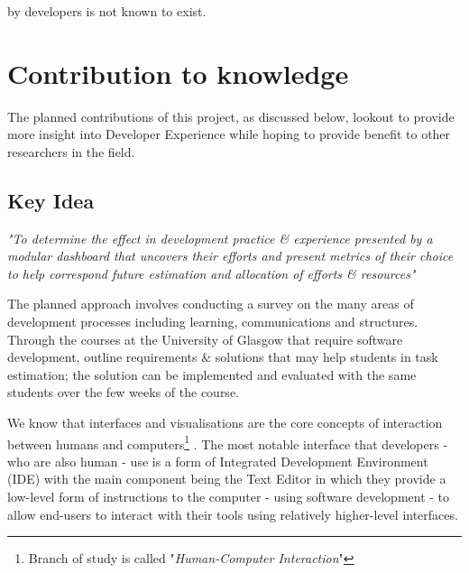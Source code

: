 \documentclass{prrcs}
\begin{document}
by developers is not known to exist.

\section*{Contribution to knowledge}



The planned contributions of this project, as discussed below, lookout to provide more insight into Developer Experience while hoping to provide benefit to other researchers in the field.

\subsection*{Key Idea}

\textit{"To determine the effect in development practice \& experience presented by a modular dashboard that uncovers their efforts and present metrics of their choice to help correspond future estimation and allocation of efforts \& resources"}

The planned approach involves conducting a survey on the many areas of development processes including learning, communications and structures. Through the courses at the University of Glasgow that require software development, outline requirements \& solutions that may help students in task estimation; the solution can be implemented and evaluated with the same students over the few weeks of the course.

We know that interfaces and visualisations are the core concepts of interaction between humans and computers\footnote{Branch of study is called "\textit{Human-Computer Interaction}"} \cite{liCategorisationVisualisationMethods2016}. The most notable interface that developers - who are also human - use is a form of Integrated Development Environment (IDE) with the main component being the Text Editor in which they provide a low-level form of instructions to the computer - using software development - to allow end-users to interact with their tools using relatively higher-level interfaces.
\end{document}
